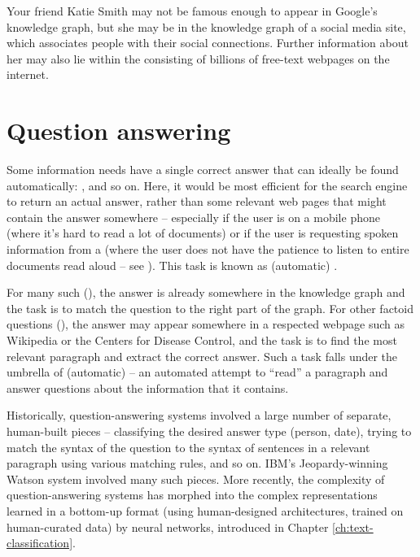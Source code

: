 Your friend Katie Smith may not be famous enough to appear in Google's knowledge graph, but she may be in the knowledge graph of a social media site, which associates people with their social connections. Further information about her  may also lie within the  consisting of billions of free-text webpages on the internet. 


\section{Question answering}

Some information needs have a single correct answer that can ideally
be found automatically: , and so
on.  Here, it would be most efficient for the search engine to return
an actual answer, rather than some relevant web pages that might
contain the answer somewhere -- especially if the user is on a mobile
phone (where it's hard to read a lot of documents) or if the user is
requesting spoken information from a  (where
the user does not have the patience to listen to entire documents read
aloud -- see ).  This task is known as (automatic) 
.

For many such  (), the answer is already somewhere in the knowledge
graph and the task is to match the question to the right part of the
graph.  For other factoid questions (), the answer may appear somewhere in a respected webpage
such as Wikipedia or the Centers for Disease Control, and the task is
to find the most relevant paragraph and extract the correct answer.
Such a task falls under the umbrella of (automatic)  -- an automated attempt to ``read'' a paragraph and
answer questions about the information that it contains.

Historically, question-answering systems involved a large number of separate, human-built pieces -- classifying the desired answer type (person, date), trying to match the syntax of the question to the syntax of sentences in a relevant paragraph using various matching rules, and so on.  IBM's Jeopardy-winning Watson system involved many such pieces.  More recently, the complexity of question-answering systems has morphed into the complex representations learned in a  bottom-up format (using human-designed architectures, trained on  human-curated data) by neural networks, introduced in Chapter  \ref{ch:text-classification}.  

